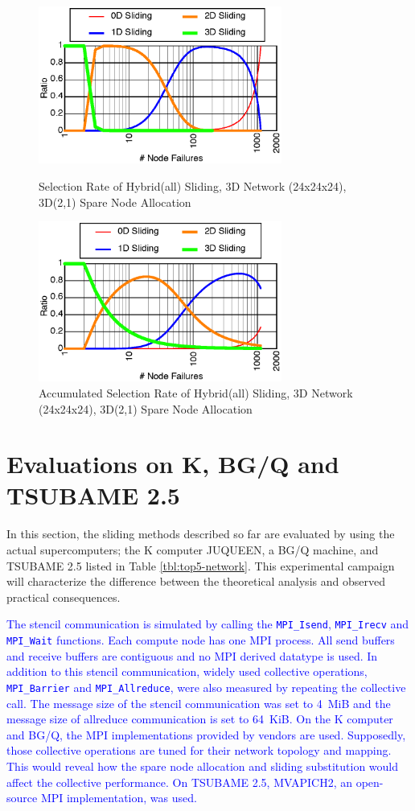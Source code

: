 \documentclass[Afour,times,sagev]{sagej}
\newcommand{\AH}[1]{%
  \textcolor{blue}{#1}}%
\begin{document}
\begin{figure}[ht]
\centering
\includegraphics[width=80mm]{Figs/HYB-24x24x24-Sel-CL.eps}
  \caption{Selection Rate of Hybrid(all) Sliding, 3D Network
    (24x24x24), 3D(2,1) Spare Node Allocation}
\label{fig:sel-rate}
\vspace{5mm}
\includegraphics[width=80mm]{Figs/HYB-24x24x24-SelA-CL.eps}
  \caption{Accumulated Selection Rate of Hybrid(all) Sliding,
    3D Network (24x24x24), 3D(2,1) Spare Node Allocation}
\label{fig:sel-rateA}
\end{figure}

\section{Evaluations on K, BG/Q and TSUBAME 2.5}
\label{sec:eval}

In this section, the sliding methods described so far are evaluated by
using the actual supercomputers; the K computer
JUQUEEN\citep{JUQUEEN}, a BG/Q machine, and TSUBAME 2.5
listed in Table \ref{tbl:top5-network}.
This experimental campaign will characterize the difference
between the theoretical analysis and observed practical consequences.

\AH{The stencil communication is simulated by calling the {\tt MPI\_Isend},
{\tt MPI\_Irecv} and {\tt MPI\_Wait} functions. Each compute node has
one MPI process. All send buffers and receive
buffers are contiguous and no MPI derived datatype is used. In
addition to this stencil communication, widely used collective
operations, {\tt MPI\_Barrier} and {\tt MPI\_Allreduce}, were also
measured by repeating the collective call. The message size of the stencil
communication was set to 4~MiB and the message size of allreduce
communication is set to 64~KiB. 
On the K computer and BG/Q, the MPI implementations provided by
vendors are used. Supposedly, those collective operations are tuned
for their network topology and mapping.  This would reveal how the
spare node allocation and sliding substitution would affect the
collective performance. On TSUBAME 2.5, MVAPICH2, an open-source
MPI implementation, was used.}
\end{document}
